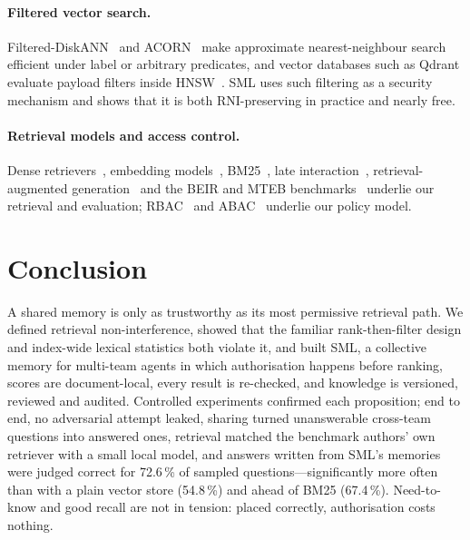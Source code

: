 \documentclass[11pt,a4paper]{article}
\theoremstyle{remark}
\newcommand{\sys}{SML}
\begin{document}
\paragraph{Filtered vector search.} Filtered-DiskANN~\cite{gollapudi2023filtered} and ACORN~\cite{patel2024acorn} make
approximate nearest-neighbour search efficient under label or arbitrary predicates, and vector databases such as Qdrant
evaluate payload filters inside HNSW~\cite{malkov2020hnsw}. \sys{} uses such filtering as a security mechanism and shows that it
is both RNI-preserving in practice and nearly free.

\paragraph{Retrieval models and access control.} Dense retrievers~\cite{reimers2019sbert,karpukhin2020dpr,lin2023dragon},
embedding models~\cite{xiao2023cpack,wang2020minilm}, BM25~\cite{robertson2009bm25}, late interaction~\cite{khattab2020colbert},
retrieval-augmented generation~\cite{lewis2020rag} and the BEIR and MTEB benchmarks~\cite{thakur2021beir,muennighoff2023mteb}
underlie our retrieval and evaluation; RBAC~\cite{sandhu1996rbac} and ABAC~\cite{hu2014abac} underlie our policy model.

\section{Conclusion}
\label{sec:conclusion}

A shared memory is only as trustworthy as its most permissive retrieval path. We defined retrieval non-interference,
showed that the familiar rank-then-filter design and index-wide lexical statistics both violate it, and built \sys{},
a collective memory for multi-team agents in which authorisation happens before ranking, scores are document-local,
every result is re-checked, and knowledge is versioned, reviewed and audited. Controlled experiments confirmed each
proposition; end to end, no adversarial attempt leaked, sharing turned unanswerable cross-team questions into answered ones,
retrieval matched the benchmark authors' own retriever with a small local model, and answers written from \sys{}'s memories
were judged correct for 72.6\,\% of sampled questions---significantly more often than with a plain vector
store (54.8\,\%) and ahead of BM25 (67.4\,\%). Need-to-know and good recall are not in
tension: placed correctly, authorisation costs nothing.
\end{document}
